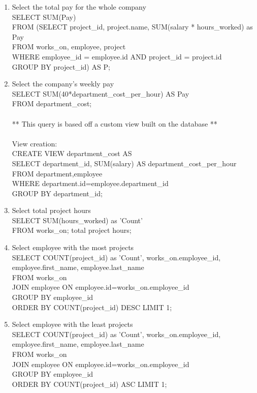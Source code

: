 \documentclass[11pt,letterpaper]{article}
\begin{document}
\begin{enumerate}
	\pagebreak
		\item Select the total pay for the whole company \\SELECT SUM(Pay) \\FROM (SELECT project\_id, project.name, SUM(salary * hours\_worked) as Pay \\FROM works\_on, employee, project \\WHERE employee\_id = employee.id AND project\_id = project.id \\GROUP BY project\_id) AS P;
		\item Select the company's weekly pay \\SELECT SUM(40*department\_cost\_per\_hour) AS Pay \\FROM department\_cost;\\ \\ ** This query is based off a custom view built on the database ** \\ \\ View creation: \\ CREATE VIEW department\_cost AS\\ SELECT department\_id, SUM(salary) AS department\_cost\_per\_hour \\FROM department,employee \\WHERE 									department.id=employee.department\_id \\GROUP BY department\_id;
		\item Select total project hours \\SELECT SUM(hours\_worked) as 'Count' \\FROM works\_on; total project hours;
		\item Select employee with the most projects \\SELECT COUNT(project\_id) as 'Count', works\_on.employee\_id, employee.first\_name, employee.last\_name \\FROM works\_on \\JOIN employee ON employee.id=works\_on.employee\_id \\GROUP BY employee\_id \\ORDER BY COUNT(project\_id) DESC LIMIT 1;
		\item Select employee with the least projects \\SELECT COUNT(project\_id) as 'Count', works\_on.employee\_id, employee.first\_name, employee.last\_name \\FROM works\_on \\JOIN employee ON employee.id=works\_on.employee\_id \\GROUP BY employee\_id \\ORDER BY COUNT(project\_id) ASC LIMIT 1;

\end{enumerate}
\end{document}
